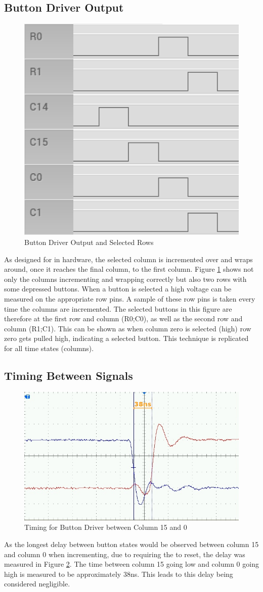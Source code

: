 \documentclass[12pt,a4paper]{report}
\begin{document}
\subsection{Button Driver Output}
\begin{figure}[h!]
	\centering
	\includegraphics[width=0.4 \textwidth]{btn_parallel.PNG}
	\caption{Button Driver Output and Selected Rows}
	\label{fig:btnOutSelected}
\end{figure}
\noindent As designed for in hardware, the selected column is incremented over and wraps around, once it reaches the final column, to the first column. Figure \ref{fig:btnOutSelected} shows not only the columns incrementing and wrapping correctly but also two rows with some depressed buttons. When a button is selected a high voltage can be measured on the appropriate row pins. A sample of these row pins is taken every time the columns are incremented. The selected buttons in this figure are therefore at the first row and column (R0;C0), as well as the second row and column (R1;C1). This can be shown as when column zero is selected (high) row zero gets pulled high, indicating a selected button. This technique is replicated for all time states (columns).
\subsection{Timing Between Signals}
\begin{figure}[h!]
	\centering
	\includegraphics[width=0.6 \textwidth]{F0004TEK.JPG}
	\caption{Timing for Button Driver between Column 15 and 0}
	\label{fig:timingBtns}
\end{figure}
\noindent As the longest delay between button states would be observed between column 15 and column 0 when incrementing, due to requiring the  to reset, the delay was measured in Figure \ref{fig:timingBtns}. The time between column 15 going low and column 0 going high is measured to be approximately 38ns. This leads to this delay being considered negligible.
\end{document}
